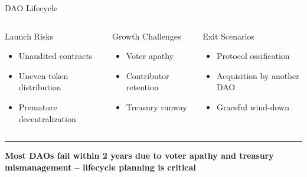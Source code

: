 \documentclass[8pt,aspectratio=169]{beamer}
\newcommand{\bottomnote}[1]{\vfill\vspace{-2mm}\textcolor{mllavender2}{\rule{\textwidth}{0.4pt}}\vspace{1mm}\footnotesize\textbf{#1}}
\begin{document}
\begin{frame}{DAO Lifecycle}
\vspace{3mm}
\begin{columns}[T]
\begin{block}{\footnotesize Launch Risks}
\scriptsize
\begin{itemize}
  \item Unaudited contracts
  \item Uneven token distribution
  \item Premature decentralization
\end{itemize}
\end{block}
\begin{block}{\footnotesize Growth Challenges}
\scriptsize
\begin{itemize}
  \item Voter apathy
  \item Contributor retention
  \item Treasury runway
\end{itemize}
\end{block}
\begin{block}{\footnotesize Exit Scenarios}
\scriptsize
\begin{itemize}
  \item Protocol ossification
  \item Acquisition by another DAO
  \item Graceful wind-down
\end{itemize}
\end{block}
\end{columns}
\bottomnote{Most DAOs fail within 2 years due to voter apathy and treasury mismanagement -- lifecycle planning is critical}
\end{frame}
\end{document}
